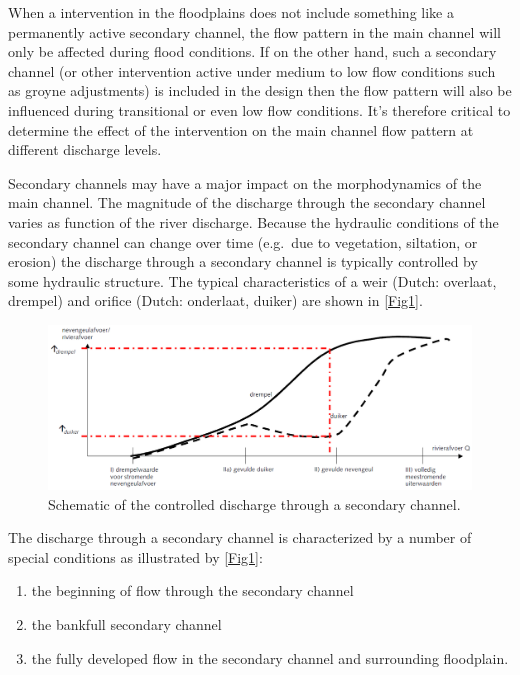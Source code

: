 When a intervention in the floodplains does not include something like a permanently active secondary channel, the flow pattern in the main channel will only be affected during flood conditions.
If on the other hand, such a secondary channel (or other intervention active under medium to low flow conditions such as groyne adjustments) is included in the design then the flow pattern will also be influenced during transitional or even low flow conditions.
It's therefore critical to determine the effect of the intervention on the main channel flow pattern at different discharge levels.

Secondary channels may have a major impact on the morphodynamics of the main channel.
The magnitude of the discharge through the secondary channel varies as function of the river discharge.
Because the hydraulic conditions of the secondary channel can change over time (e.g.~due to vegetation, siltation, or erosion) the discharge through a secondary channel is typically controlled by some hydraulic structure.
The typical characteristics of a weir (Dutch: overlaat, drempel) and orifice (Dutch: onderlaat, duiker) are shown in \autoref{Fig1}.

\begin{figure}[b]
\includegraphics[width=\columnwidth]{figures/Fig1.png}
\caption{Schematic of the controlled discharge through a secondary channel.}
\label{Fig1}
\end{figure}

The discharge through a secondary channel is characterized by a number of special conditions as illustrated by \autoref{Fig1}:

\begin{enumerate}
\item the beginning of flow through the secondary channel
\item the bankfull secondary channel
\item the fully developed flow in the secondary channel and surrounding floodplain.
\end{enumerate}

